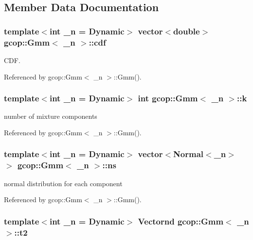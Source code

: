 \subsection{\-Member \-Data \-Documentation}
\subsubsection[{cdf}]{\setlength{\rightskip}{0pt plus 5cm}template$<$int \-\_\-n = \-Dynamic$>$ vector$<$double$>$ {\bf gcop\-::\-Gmm}$<$ \-\_\-n $>$\-::{\bf cdf}}\label{classgcop_1_1Gmm_ae7c0387be73debebf4bce5f0ec84a25a}


\-C\-D\-F. 



\-Referenced by gcop\-::\-Gmm$<$ \-\_\-n $>$\-::\-Gmm().

\subsubsection[{k}]{\setlength{\rightskip}{0pt plus 5cm}template$<$int \-\_\-n = \-Dynamic$>$ int {\bf gcop\-::\-Gmm}$<$ \-\_\-n $>$\-::{\bf k}}\label{classgcop_1_1Gmm_a1c05ac8fc2e2c5f089d71eed8ce223fe}


number of mixture components 



\-Referenced by gcop\-::\-Gmm$<$ \-\_\-n $>$\-::\-Gmm().

\subsubsection[{ns}]{\setlength{\rightskip}{0pt plus 5cm}template$<$int \-\_\-n = \-Dynamic$>$ vector$<${\bf \-Normal}$<$\-\_\-n$>$ $>$ {\bf gcop\-::\-Gmm}$<$ \-\_\-n $>$\-::{\bf ns}}\label{classgcop_1_1Gmm_aabef3f893e4e37d5955f83ba0dee1402}


normal distribution for each component 



\-Referenced by gcop\-::\-Gmm$<$ \-\_\-n $>$\-::\-Gmm().

\subsubsection[{t2}]{\setlength{\rightskip}{0pt plus 5cm}template$<$int \-\_\-n = \-Dynamic$>$ {\bf \-Vectornd} {\bf gcop\-::\-Gmm}$<$ \-\_\-n $>$\-::{\bf t2}\hspace{0.3cm}{\ttfamily  [protected]}}\label{classgcop_1_1Gmm_a5b7f8e55fbd5d071e24f235aa93bc023}


